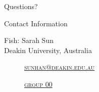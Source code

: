 \documentclass[
 size=14pt,
 paper=smartboard,  %
 mode=present, 		%
 display=slides, 	%
 style=tuliplab,  	%
 pauseslide,
 fleqn,leqno]{powerdot}
\begin{document}
%
\begin{slide}[toc=,bm=]{Questions?}
\begin{center}
\begin{figure}
\end{figure}
\end{center}
\end{slide}


\begin{wideslide}[toc=,bm=]{Contact Information}
\centering
{}
\twocolumn[
lcolwidth=0.35\linewidth,
rcolwidth=0.65\linewidth
]
{
}
{
Fish: Sarah Sun\\
Deakin University, Australia
\begin{description}
 \item[\textcolor{orange}{\faEnvelope}] \href{mailto:sunhan@deakin.edu.au}
 {\textsc{\footnotesize{sunhan@deakin.edu.au}}}

 \item[\textcolor{orange}{\faHome}] \href{http://www.tulip.org.au}
 {\textsc{\footnotesize{group 00}}}
\end{description}
}
\end{wideslide}
\end{document}
